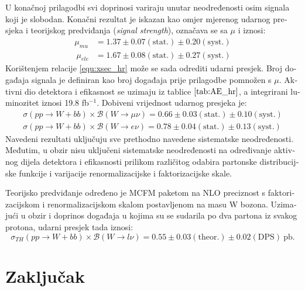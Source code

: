 \begin{otherlanguage}{croatian}
U konačnoj prilagodbi svi doprinosi variraju unutar neodređenosti osim signala koji je slobodan. Konačni rezultat je iskazan kao omjer mjerenog udarnog presjeka i teorijskog predviđanja (\textit{signal strength}), označava se sa $\mu$ i iznosi:
\begin{align*}
\mu_{mu} &= 1.37 \pm 0.07\mathrm{(stat.)} \pm 0.20 \mathrm{(syst.)}\\\
\mu_{ele} &= 1.67 \pm 0.08\mathrm{(stat.)} \pm 0.27\mathrm{(syst.)}
\end{align*}
Korištenjem relacije \ref{equ:xsec_hr} može se sada odrediti udarni presjek. Broj događaja signala je definiran kao broj događaja prije prilagodbe pomnožen s $\mu$. Aktivni dio detektora i efikasnost se uzimaju iz tablice $\ref{tab:AE_hr}$, a integrirani luminozitet iznosi 19.8 fb$^{-1}$. Dobiveni vrijednost udarnog presjeka je:
\begin{align*}
\sigma(pp\rightarrow W+bb)\times \mathcal{B}(W\rightarrow \mu\nu) = 0.66 \pm 0.03(\mathrm{stat.}) \pm 0.10(\mathrm{syst.})\\
\sigma(pp\rightarrow W+bb)\times \mathcal{B}(W\rightarrow e\nu) = 0.78 \pm 0.04(\mathrm{stat.}) \pm 0.13(\mathrm{syst.})
\end{align*} 
Navedeni rezultati uključuju sve prethodno navedene sistematske neodređenosti. Međutim, u obzir nisu uključeni sistematske neodređenosti na određivanje aktivnog dijela detektora i efikasnosti prilikom različitog odabira partonske distribucijske funkcije i varijacije renormalizacijske i faktorizacijske skale.
\par Teorijsko predviđanje određeno je MCFM paketom na NLO preciznost s faktorizacijskom i renormalizacijskom skalom postavljenom na masu W bozona. Uzimajući u obzir i doprinos događaja u kojima su se sudarila po dva partona iz svakog protona, udarni presjek tada iznosi:
\begin{equation*}
\sigma_{TH}(pp\rightarrow W+bb)\times \mathcal{B}(W\rightarrow l\nu) = 0.55 \pm 0.03 \mathrm{(theor.)} \pm 0.02 \mathrm{(DPS)} \mathrm{\ pb}.
\end{equation*}

 

\section{Zaključak}


\end{otherlanguage}
